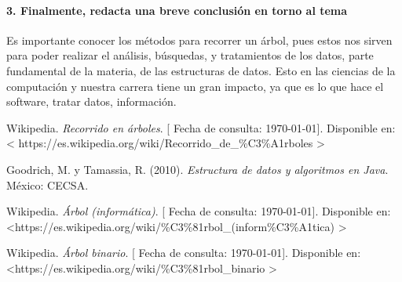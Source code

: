 \documentclass[spanish,12pt,letterpapper]{article}
\begin{document}
	\paragraph{3. Finalmente, redacta una breve conclusión en torno al tema\\}
	Es importante conocer los métodos para recorrer un árbol, pues estos nos sirven para poder realizar el análisis, búsquedas, y tratamientos de los datos, parte fundamental de la materia, de las estructuras de datos. Esto en las ciencias de la computación y nuestra carrera tiene un gran impacto, ya que es lo que hace el software, tratar datos, información.

	\pagebreak
	\begin{thebibliography}{9}
		 Wikipedia. 
		\emph{Recorrido en árboles}.  {[} Fecha de consulta: \today {]}. Disponible en: \textless 
		https://es.wikipedia.org/wiki/Recorrido\_de\_\%C3\%A1rboles \textgreater
		
		 Goodrich, M. y Tamassia, R. (2010).
		\emph{Estructura de datos y algoritmos en Java}. México: CECSA.
		
		 Wikipedia. 
		\emph{Árbol (informática)}.  {[} Fecha de consulta: \today {]}. Disponible en: \textless https://es.wikipedia.org/wiki/\%C3\%81rbol\_(inform\%C3\%A1tica) \textgreater
		
		 Wikipedia. 
		\emph{Árbol binario}.  {[} Fecha de consulta: \today {]}. Disponible en: \textless https://es.wikipedia.org/wiki/\%C3\%81rbol\_binario \textgreater

	\end{thebibliography}
	
\end{document}
